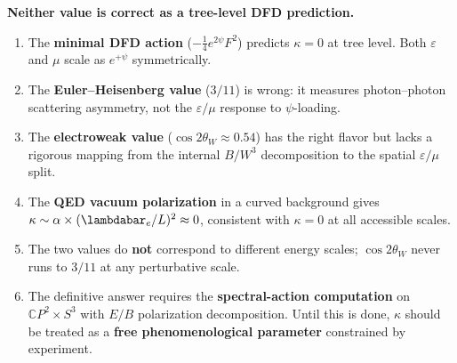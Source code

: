 \documentclass[11pt,a4paper]{article}
\begin{document}
\begin{tcolorbox}[colback=blue!5!white, colframe=blue!50!black,
title=Final Verdict]
\textbf{Neither value is correct as a tree-level DFD prediction.}

\begin{enumerate}
\item The \textbf{minimal DFD action} ($-\frac{1}{4}e^{2\psi}F^2$) predicts
$\kappa = 0$ at tree level.  Both $\varepsilon$ and $\mu$ scale as
$e^{+\psi}$ symmetrically.

\item The \textbf{Euler--Heisenberg value} ($3/11$) is wrong: it measures
photon--photon scattering asymmetry, not the $\varepsilon/\mu$ response
to $\psi$-loading.

\item The \textbf{electroweak value} ($\cos 2\theta_W \approx 0.54$) has
the right flavor but lacks a rigorous mapping from the internal $B/W^3$
decomposition to the spatial $\varepsilon/\mu$ split.

\item The \textbf{QED vacuum polarization} in a curved background gives
$\kappa \sim \alpha \times (\lambdabar_e/L)^2 \approx 0$, consistent
with $\kappa = 0$ at all accessible scales.

\item The two values do \textbf{not} correspond to different energy scales;
$\cos 2\theta_W$ never runs to $3/11$ at any perturbative scale.

\item The definitive answer requires the \textbf{spectral-action
computation} on $\mathbb{C}P^2 \times S^3$ with $E/B$ polarization
decomposition.  Until this is done, $\kappa$ should be treated as a
\textbf{free phenomenological parameter} constrained by experiment.
\end{enumerate}
\end{tcolorbox}
\end{document}
